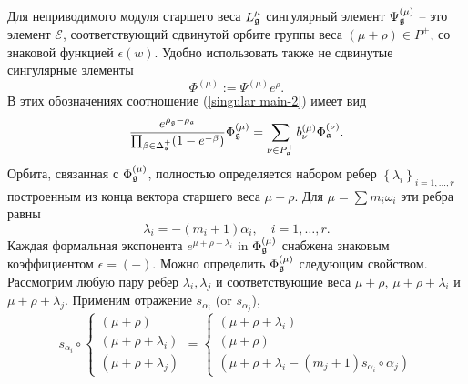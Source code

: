 Для неприводимого модуля старшего веса $L_{\mathfrak{g}}^{\mu }$ сингулярный элемент $\Psi _{\mathfrak{g}}^{\left( \mu \right) }$ -- это элемент $\mathcal{E}$, соответствующий сдвинутой орбите группы веса $\left( \mu +\rho\right) \in P^{+}$, со знаковой функцией $\epsilon \left( w\right) $. Удобно использовать также не сдвинутые сингулярные элементы
\begin{equation}
\Phi ^{\left( \mu \right) }:=\Psi ^{\left( \mu \right) }e^{\rho }.
\label{definition Phi}
\end{equation}
В этих обозначениях соотношение (\ref{singular main-2}) имеет вид
\begin{equation}
\frac{e^{\rho _{\gf}-\rho _{\af}}}{\prod_{\beta \in \Delta _{\frak{%
s}}^{+}}(1-e^{-\beta })}\Phi _{\gf}^{\left( \mu \right) }=\sum_{\nu \in
P_{\af}^{+}}b_{\nu }^{(\mu )}\Phi _{\af}^{\left( \nu \right) }.
\label{singular main-3}
\end{equation}
Орбита, связанная с  $\Phi _{\mathfrak{g}}^{\left( \mu \right) }$, полностью определяется набором ребер $\left\{ \lambda _{i}\right\} _{i=1,\dots ,r}$ построенным из конца вектора старшего веса $\mu +\rho $. Для $\mu=\sum m_{i}\omega _{i}$ эти ребра равны
\begin{equation}
\lambda _{i}=-\left( m_{i}+1\right) \alpha _{i},\quad i=1,\dots ,r.
\label{edge}
\end{equation}
Каждая формальная экспонента $e^{\mu +\rho +\lambda _{i}}$ in $\Phi _{\mathfrak{g}}^{\left( \mu \right) }$ снабжена знаковым коэффициентом  $\epsilon =(-)$. Можно определить $\Phi_{\mathfrak{g}}^{\left( \mu \right) }$ следующим свойством. Рассмотрим любую пару ребер $\lambda _{i},\lambda _{j}$ и соответствующие веса $\mu +\rho $, $\mu +\rho +\lambda _{i}$ и $\mu +\rho +\lambda _{j}$. 
Применим отражение $s_{\alpha _{i}}$ (or $s_{\alpha _{j}}$),
\begin{equation}
s_{\alpha _{i}}\circ \left\{
\begin{array}{l}
\left( \mu +\rho \right)  \\
\left( \mu +\rho +\lambda _{i}\right)  \\
\left( \mu +\rho +\lambda _{j}\right)
\end{array}
\right. =\left\{
\begin{array}{l}
\left( \mu +\rho +\lambda _{i}\right)  \\
\left( \mu +\rho \right)  \\
\left( \mu +\rho +\lambda _{i}-(m_{j}+1)s_{\alpha _{i}}\circ \alpha
_{j}\right)
\end{array}
\right.   \label{reflected triple}
\end{equation}

